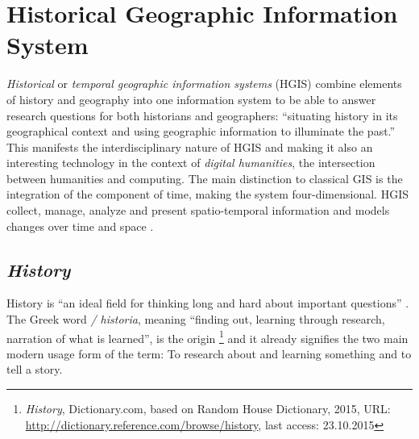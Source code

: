 





\section{Historical Geographic Information System} %
\label{sec:historical_geographic_information_system}

\emph{Historical} or \emph{temporal geographic information systems} (HGIS) combine elements of history and geography into one information system to be able to answer research questions for both historians and geographers: ``situating history in its geographical context and using geographic information to illuminate the past.''
\cite[p. 3]{knowles2008placing}
This manifests the interdisciplinary nature of HGIS and making it also an interesting technology in the context of \emph{digital humanities}, the intersection between humanities and computing. The main distinction to classical GIS is the integration of the component of time, making the system four-dimensional. HGIS collect, manage, analyze and present spatio-temporal information and models changes over time and space
\cite[p. xii]{knowles2002past}.


\subsection{\emph{History}} %

History is ``an ideal field for thinking long and hard about important questions''
\cite{ahaFiveCs}.
The Greek word \emph{\textIota\textsigma\texttau\textomikron\textrho\textiota\textalpha / historia}, meaning ``finding out, learning through research, narration of what is learned'', is the origin
\footnote{
  \textit{History},
  Dictionary.com, based on Random House Dictionary, 2015,
  URL: \url{http://dictionary.reference.com/browse/history},
  last access: 23.10.2015
}
and it already signifies the two main modern usage form of the term: To research about and learning something and to tell a story.

